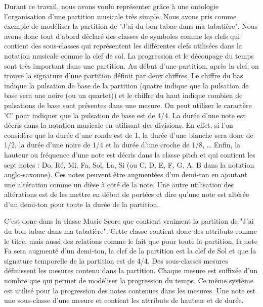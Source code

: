 \documentclass[paper=a4, fontsize=11pt]{scrartcl} %
\numberwithin{equation}{section} %
\numberwithin{figure}{section} %
\numberwithin{table}{section} %
\begin{document}
Durant ce travail, nous avons voulu représenter grâce à une ontologie l'organisation d'une partition musicale très simple.
Nous avons pris comme exemple de modéliser la partition de "J'ai du bon tabac dans ma tabatière".
Nous avons donc tout d'abord déclaré des classes de symboles comme les clefs qui contient des sous-classes qui représentent les différentes clefs utilisées dans la notation musicale comme la clef de sol.
La progression et le découpage du temps sont très important dans une partition.
Au début d'une partition, après la clef, on trouve la signature d'une partition définit par deux chiffres.
Le chiffre du bas indique la pulsation de base de la partition (quatre indique que la pulsation de base sera une noire (ou un quartet)) et le chiffre du haut indique combien de pulsations de base sont présentes dans une mesure.
On peut utiliser le caractère 'C' pour indiquer que la pulsation de base est de 4/4.
La durée d'une note est décris dans la notation musicale en utilisant des divisions.
En effet, si l'on considère que la durée d'une ronde est de 1, la durée d'une blanche sera donc de 1/2, la durée d'une noire de 1/4 et la durée d'une croche de 1/8, \ldots
Enfin, la hauteur ou fréquence d'une note est décris dans la classe pitch et qui contient les sept notes : Do, Ré, Mi, Fa, Sol, La, Si (ou C, D, E, F, G, A, B dans la notation anglo-saxonne).
Ces notes peuvent être augmentées d'un demi-ton en ajoutant une altération comme un dièse à côté de la note.
Une autre utilisation des altérations est de les mettre en début de portées et dire qu'une note est altérée d'un demi-ton pour toute la durée de la partition.

C'est donc dans la classe Music Score que contient vraiment la partition de "J'ai du bon tabac dans ma tabatière".
Cette classe contient donc des attributs comme le titre, mais aussi des relations comme le fait que pour toute la partition, la note Fa sera augmenté d'un demi-ton, la clef de la partition est la clef de Sol et que la signature temporelle de la partition est de 4/4.
Des sous-classes mesures définissent les mesures contenu dans la partition.
Chaque mesure est suffixée d'un nombre que qui permet de modéliser la progression du temps.
Ce même système est utilisé pour la progression des notes contenues dans les mesures.
Une note est une sous-classe d'une mesure et contient les attributs de hauteur et de durée.


%
%
\end{document}
